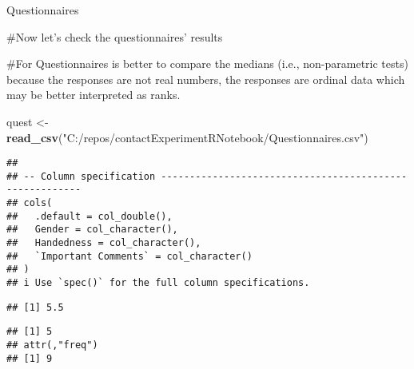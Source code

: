\documentclass[
]{article}
\newenvironment{Shaded}{\begin{snugshade}}{\end{snugshade}}
\newcommand{\CommentTok}[1]{\textcolor[rgb]{0.56,0.35,0.01}{\textit{#1}}}
\newcommand{\KeywordTok}[1]{\textcolor[rgb]{0.13,0.29,0.53}{\textbf{#1}}}
\newcommand{\NormalTok}[1]{#1}
\newcommand{\OperatorTok}[1]{\textcolor[rgb]{0.81,0.36,0.00}{\textbf{#1}}}
\newcommand{\StringTok}[1]{\textcolor[rgb]{0.31,0.60,0.02}{#1}}
\begin{document}
Questionnaires

\#Now let's check the questionnaires' results

\#For Questionnaires is better to compare the medians (i.e.,
non-parametric tests) because the responses are not real numbers, the
responses are ordinal data which may be better interpreted as ranks.

\begin{Shaded}
\begin{Highlighting}[]
\NormalTok{quest <-}\StringTok{ }\KeywordTok{read_csv}\NormalTok{(}\StringTok{"C:/repos/contactExperimentRNotebook/Questionnaires.csv"}\NormalTok{)}
\end{Highlighting}
\end{Shaded}

\begin{verbatim}
## 
## -- Column specification --------------------------------------------------------
## cols(
##   .default = col_double(),
##   Gender = col_character(),
##   Handedness = col_character(),
##   `Important Comments` = col_character()
## )
## i Use `spec()` for the full column specifications.
\end{verbatim}

\begin{Shaded}
\end{Shaded}

\begin{verbatim}
## [1] 5.5
\end{verbatim}

\begin{Shaded}
\end{Shaded}

\begin{verbatim}
## [1] 5
## attr(,"freq")
## [1] 9
\end{verbatim}

\begin{Shaded}
\end{Shaded}
\end{document}
